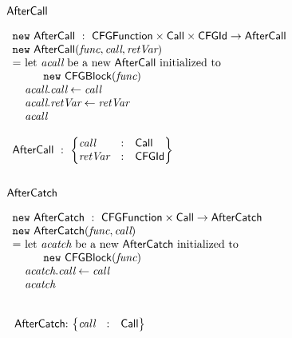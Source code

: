 \subsection{$\mbox{\textsf{AfterCall}}$}
$
\begin{array}{l@{}l@{~}l}
\lefteqn{\new \ \AfterCall \ : \ \CFGFunction \times \Call \times \CFGId \rightarrow \AfterCall} \\
\lefteqn{\new\ \AfterCall(\emph{func}, \emph{call}, \emph{retVar})}\\
& = & \text{let } \emph{acall} \text{ be a new } \AfterCall \text{ initialized to}\\
&& \quad\ \ \new\ \CFGBlock(\emph{func})\\
& & \emph{acall}.\emph{call} \leftarrow \emph{call}\\
& & \emph{acall}.\emph{retVar} \leftarrow \emph{retVar}\\
& & \emph{acall}\\\\
\lefteqn{\AfterCall \ : \
\begin{Bmatrix*}[l]
\emph{call} & : & \Call \\
\emph{retVar} & : & \CFGId \\
\end{Bmatrix*}}
\end{array}
$

\subsection{$\mbox{\textsf{AfterCatch}}$}
$
\begin{array}{l@{}l@{~}l}
\lefteqn{\new \ \AfterCatch \ : \ \CFGFunction \times \Call \rightarrow \AfterCatch}\\
\lefteqn{\new\ \AfterCatch(\emph{func}, \emph{call})}\\
& = & \text{let } \emph{acatch} \text{ be a new } \AfterCatch \text{ initialized to }\\
& & \quad\ \ \new\ \CFGBlock(\emph{func})\\
& & \emph{acatch}.\emph{call} \leftarrow \emph{call}\\
& & \emph{acatch}\\
\end{array}
$

\noindent
$
\begin{array}{@{~}r@{~}l@{}l@{~}l}
\\
& \AfterCatch & : &
\begin{Bmatrix*}[l]
\emph{call} & : & \Call \\
\end{Bmatrix*}\\
\end{array}
$

